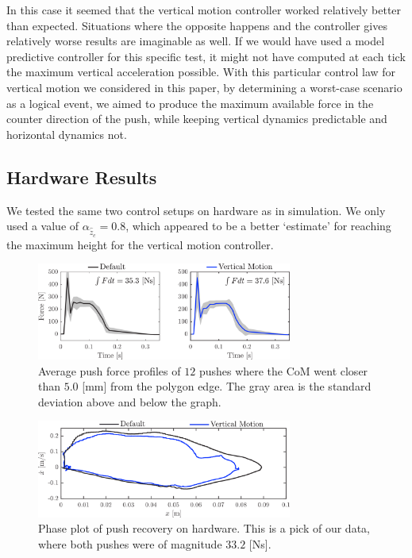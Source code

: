 \documentclass[letterpaper, 10 pt, conference]{ieeeconf}  %
\begin{document}
In this case it seemed that the vertical motion controller worked relatively better than expected. Situations where the opposite happens and the controller gives relatively worse results are imaginable as well. If we would have used a model predictive controller for this specific test, it might not have computed at each tick the maximum vertical acceleration possible. With this particular control law for vertical motion we considered in this paper, by determining a worst-case scenario as a logical event, we aimed to produce the maximum available force in the counter direction of the push, while keeping vertical dynamics predictable and horizontal dynamics not.

\subsection{Hardware Results}
We tested the same two control setups on hardware as in simulation. We only used a value of $\alpha_{\hat{\ddot{z}}_{c}}=0.8$, which appeared to be a better `estimate' for reaching the maximum height for the vertical motion controller.
\begin{figure}
      \centering
      \includegraphics[width=3.3in]{impulsecompare.png}
      \caption{Average push force profiles of $12$ pushes where the CoM went closer than $5.0$ [mm] from the polygon edge. The gray area is the standard deviation above and below the graph. }
      \label{fig:impulsecompare}
\end{figure}
\begin{figure}
      \centering
      \includegraphics[width=3.3in]{valcomparephaseHW.png}
      \caption{Phase plot of push recovery on hardware. This is a pick of our data, where both pushes were of magnitude $33.2$ [Ns]. }
      \label{fig:valcomparephaseHW}
\end{figure}
\end{document}
